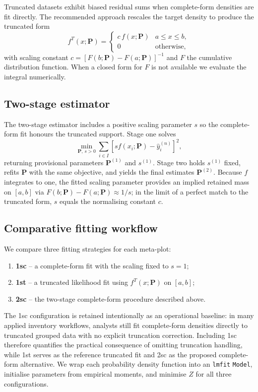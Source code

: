 Truncated datasets exhibit biased residual sums when complete-form densities are fit directly. The recommended approach rescales the target density to produce the truncated form
\begin{equation}
  f^{T}(x; \bm{P}) =
    \begin{cases}
      c\, f(x; \bm{P}) & a \leq x \leq b, \\
      0 & \text{otherwise},
    \end{cases}
\end{equation}
with scaling constant $c = [F(b; \bm{P}) - F(a; \bm{P})]^{-1}$ and $F$ the cumulative distribution function. When a closed form for $F$ is not available we evaluate the integral numerically.

\subsection{Two-stage estimator}
\label{sec:methods_twostage}

The two-stage estimator includes a positive scaling parameter $s$ so the complete-form fit honours the truncated support. Stage one solves
\begin{equation}
  \min_{\bm{P},\, s>0} \sum_{i \in I} \left[s f(x_i; \bm{P}) - \hat{y}_i^{(n)}\right]^2,
\end{equation}
returning provisional parameters $\bm{P}^{(1)}$ and $s^{(1)}$. Stage two holds $s^{(1)}$ fixed, refits $\bm{P}$ with the same objective, and yields the final estimates $\bm{P}^{(2)}$.
Because $f$ integrates to one, the fitted scaling parameter provides an implied retained mass on $[a,b]$ via $F(b;\bm{P})-F(a;\bm{P}) \approx 1/s$; in the limit of a perfect match to the truncated form, $s$ equals the normalising constant $c$.

\subsection{Comparative fitting workflow}
\label{sec:methods_benchmark}

We compare three fitting strategies for each meta-plot:
\begin{enumerate}
  \item \textbf{1sc} -- a complete-form fit with the scaling fixed to $s = 1$;
  \item \textbf{1st} -- a truncated likelihood fit using $f^{T}(x; \bm{P})$ on $[a, b]$;
  \item \textbf{2sc} -- the two-stage complete-form procedure described above.
\end{enumerate}
The 1sc configuration is retained intentionally as an operational baseline: in many applied inventory workflows, analysts still fit complete-form densities directly to truncated grouped data with no explicit truncation correction. Including 1sc therefore quantifies the practical consequence of omitting truncation handling, while 1st serves as the reference truncated fit and 2sc as the proposed complete-form alternative.
We wrap each probability density function into an \texttt{lmfit} \texttt{Model}, initialise parameters from empirical moments, and minimise $Z$ for all three configurations.

